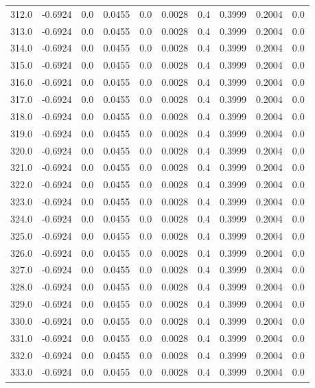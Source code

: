 \begin{longtable}{lrrrrrrrrr}
312.0 & -0.6924 & 0.0 & 0.0455 & 0.0 & 0.0028 & 0.4 & 0.3999 & 0.2004 & 0.0 \\
313.0 & -0.6924 & 0.0 & 0.0455 & 0.0 & 0.0028 & 0.4 & 0.3999 & 0.2004 & 0.0 \\
314.0 & -0.6924 & 0.0 & 0.0455 & 0.0 & 0.0028 & 0.4 & 0.3999 & 0.2004 & 0.0 \\
315.0 & -0.6924 & 0.0 & 0.0455 & 0.0 & 0.0028 & 0.4 & 0.3999 & 0.2004 & 0.0 \\
316.0 & -0.6924 & 0.0 & 0.0455 & 0.0 & 0.0028 & 0.4 & 0.3999 & 0.2004 & 0.0 \\
317.0 & -0.6924 & 0.0 & 0.0455 & 0.0 & 0.0028 & 0.4 & 0.3999 & 0.2004 & 0.0 \\
318.0 & -0.6924 & 0.0 & 0.0455 & 0.0 & 0.0028 & 0.4 & 0.3999 & 0.2004 & 0.0 \\
319.0 & -0.6924 & 0.0 & 0.0455 & 0.0 & 0.0028 & 0.4 & 0.3999 & 0.2004 & 0.0 \\
320.0 & -0.6924 & 0.0 & 0.0455 & 0.0 & 0.0028 & 0.4 & 0.3999 & 0.2004 & 0.0 \\
321.0 & -0.6924 & 0.0 & 0.0455 & 0.0 & 0.0028 & 0.4 & 0.3999 & 0.2004 & 0.0 \\
322.0 & -0.6924 & 0.0 & 0.0455 & 0.0 & 0.0028 & 0.4 & 0.3999 & 0.2004 & 0.0 \\
323.0 & -0.6924 & 0.0 & 0.0455 & 0.0 & 0.0028 & 0.4 & 0.3999 & 0.2004 & 0.0 \\
324.0 & -0.6924 & 0.0 & 0.0455 & 0.0 & 0.0028 & 0.4 & 0.3999 & 0.2004 & 0.0 \\
325.0 & -0.6924 & 0.0 & 0.0455 & 0.0 & 0.0028 & 0.4 & 0.3999 & 0.2004 & 0.0 \\
326.0 & -0.6924 & 0.0 & 0.0455 & 0.0 & 0.0028 & 0.4 & 0.3999 & 0.2004 & 0.0 \\
327.0 & -0.6924 & 0.0 & 0.0455 & 0.0 & 0.0028 & 0.4 & 0.3999 & 0.2004 & 0.0 \\
328.0 & -0.6924 & 0.0 & 0.0455 & 0.0 & 0.0028 & 0.4 & 0.3999 & 0.2004 & 0.0 \\
329.0 & -0.6924 & 0.0 & 0.0455 & 0.0 & 0.0028 & 0.4 & 0.3999 & 0.2004 & 0.0 \\
330.0 & -0.6924 & 0.0 & 0.0455 & 0.0 & 0.0028 & 0.4 & 0.3999 & 0.2004 & 0.0 \\
331.0 & -0.6924 & 0.0 & 0.0455 & 0.0 & 0.0028 & 0.4 & 0.3999 & 0.2004 & 0.0 \\
332.0 & -0.6924 & 0.0 & 0.0455 & 0.0 & 0.0028 & 0.4 & 0.3999 & 0.2004 & 0.0 \\
333.0 & -0.6924 & 0.0 & 0.0455 & 0.0 & 0.0028 & 0.4 & 0.3999 & 0.2004 & 0.0 \\

\end{longtable}
